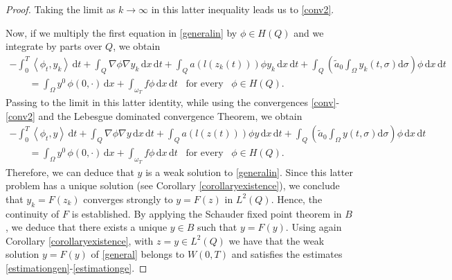 \documentclass[reqno,twoside]{amsart}
\numberwithin{equation}{section}
\theoremstyle{definition}
\numberwithin{equation}{section}
\def \dis {\displaystyle}
\def \dx{\mathrm{d}x}
\def \dt{\mathrm{d}t}
\def \dq {\mathrm{d}x \, \mathrm{d}t}
\def \d {\mathrm{d}}
\begin{document}
\begin{proof}
	Taking the limit as $k\to \infty$ in this latter inequality leads us to \eqref{conv2}.
	
	Now, if we multiply the first equation in \eqref{generalin} by $\phi\in H(Q)$ and we integrate by parts over $Q$, we obtain
	\begin{equation*}
		\begin{array}{lll}
			\dis -\int_{0}^{T} \left\langle \phi_t,y_k\right\rangle \, \dt + \int_Q \nabla \phi\nabla y_k\, \dq+\int_Q a\left(l(z_k(t))\right) \phi y_k\, \dq+\int_Q\left(\tilde{a}_0 \dis \int_{\Omega}y_k(t,\sigma)\d\sigma\right)\phi\, \dq\\
			\qquad =
			\dis \int_\Omega y^0\,\phi(0,\cdot)\, \dx+\int_{\omega_T}f\phi\,\dq \;\;\;\text{for every}\;\;\; \phi \in H(Q).
		\end{array}
	\end{equation*}
	Passing to the limit in this latter identity, while using the convergences \eqref{conv}-\eqref{conv2} and the Lebesgue dominated convergence Theorem, we obtain
	\begin{equation}\label{2}
		\begin{array}{lll}
			\dis -\int_{0}^{T} \left\langle \phi_t,y\right\rangle \, \dt + \int_Q \nabla \phi\nabla y\, \dq+\int_Q a\left(l(z(t))\right) \phi y\, \dq+ \int_Q\left(\tilde{a}_0 \dis \int_{\Omega}y(t,\sigma)\d\sigma\right)\phi\, \dq\\
			\qquad =
			\dis \int_\Omega y^0\,\phi(0,\cdot)\, \dx+\int_{\omega_T}f\phi\,\dq \;\;\;\text{for every}\;\;\; \phi \in H(Q).
		\end{array}
	\end{equation}
	Therefore,  we can
	deduce that $y$ is a weak solution to \eqref{generalin}. Since this latter problem has a unique solution (see Corollary \ref{corollaryexistence}),  we conclude that  $y_k=F(z_k)$ converges strongly to $y=F(z)$ in $L^2(Q)$. Hence, the continuity of $F$ is established. By applying the Schauder fixed point theorem in $B$, we deduce that there exists a unique $y\in B$ such that $y=F(y)$. 
	Using again Corollary \ref{corollaryexistence}, with $z=y\in L^2(Q)$ we have that the weak solution $y=F(y)$ of \eqref{general} belongs to $W(0,T)$ and satisfies the estimates \eqref{estimationgen}-\eqref{estimationge}.
	

\end{proof}
\end{document}
